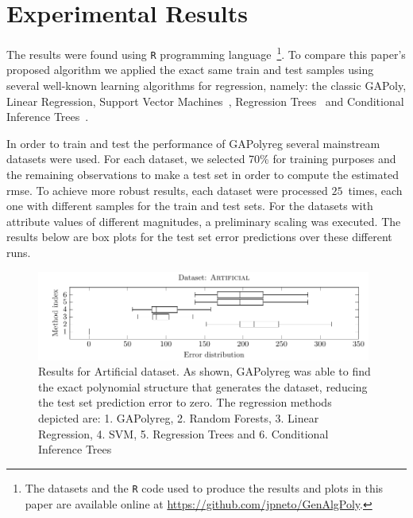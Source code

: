 \documentclass[preprint,authoryear,12pt]{elsarticle}
\begin{document}
\section{Experimental Results}

The results were found using \texttt{R} programming language~\citep{R}\footnote{The datasets and the \texttt{R} code used to produce the results and plots in this paper are available online at \url{https://github.com/jpneto/GenAlgPoly}.}. To compare this paper's proposed algorithm we applied the exact same train and test samples using several well-known learning algorithms for regression, namely: the classic \ac{GAPoly}, Linear Regression, Support Vector Machines~\citep{Meyer12}, Regression Trees~\citep{Therneau13} and Conditional Inference Trees~\citep{Hothorn06, Strobl07, Strobl08}.

In order to train and test the performance of \ac{GAPolyreg} several mainstream datasets were used. For each dataset, we selected 70\% for training purposes and the remaining observations to make a test set in order to compute the estimated \ac{rmse}. To achieve more robust results, each dataset were processed $25$~times, each one with different samples for the train and test sets. For the datasets with attribute values of different magnitudes, a preliminary scaling was executed. The results below are box plots for the test set error predictions over these different runs.

\begin{figure}[tb]\begin{center}
\includegraphics[width=0.98\textwidth]{figure_2.pdf}

\caption{Results for Artificial dataset. As shown, \ac{GAPolyreg} was able to find the exact polynomial structure that generates the dataset, reducing the test set prediction error to zero.  The regression methods depicted are: 1. \ac{GAPolyreg}, 2. Random Forests, 3. Linear Regression, 4. SVM, 5. Regression Trees and 6. Conditional Inference Trees}
\label{artificial_dataset1_lambda1.0}

\end{center}\end{figure}
\end{document}
